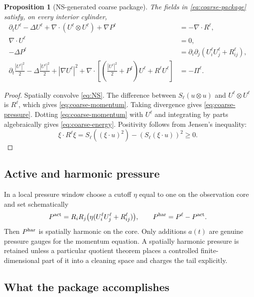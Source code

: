 \documentclass[11pt]{article}
\numberwithin{equation}{section}
\newtheorem{proposition}[theorem]{Proposition}
\theoremstyle{remark}
\begin{document}
\begin{proposition}[NS-generated coarse package]\label{prop:coarse-package}
The fields in \eqref{eq:coarse-package} satisfy, on every interior cylinder,
\begin{align}
\partial_tU^\ell-\Delta U^\ell
+\nabla\cdot(U^\ell\otimes U^\ell)+\nabla P^\ell
&=-\nabla\cdot R^\ell,\label{eq:coarse-momentum}\\
\nabla\cdot U^\ell&=0,\label{eq:coarse-div}\\
-\Delta P^\ell&=\partial_i\partial_j
(U_i^\ell U_j^\ell+R_{ij}^\ell),\label{eq:coarse-pressure}\\
\partial_t\frac{|U^\ell|^2}{2}
-\Delta\frac{|U^\ell|^2}{2}
+|\nabla U^\ell|^2
+\nabla\cdot\left[
\left(\frac{|U^\ell|^2}{2}+P^\ell\right)U^\ell+R^\ell U^\ell
\right]
&=-\Pi^\ell.\label{eq:coarse-energy}
\end{align}
\end{proposition}

\begin{proof}
Spatially convolve \eqref{eq:NS}. The difference between $S_\ell(u\otimes u)$ and $U^\ell\otimes U^\ell$ is $R^\ell$, which gives \eqref{eq:coarse-momentum}. Taking divergence gives \eqref{eq:coarse-pressure}. Dotting \eqref{eq:coarse-momentum} with $U^\ell$ and integrating by parts algebraically gives \eqref{eq:coarse-energy}. Positivity follows from Jensen's inequality:
\[
\xi\cdot R^\ell\xi
=S_\ell((\xi\cdot u)^2)-(S_\ell(\xi\cdot u))^2\ge0.
\]
\end{proof}

\subsection{Active and harmonic pressure}

In a local pressure window choose a cutoff $\eta$ equal to one on the observation core and set schematically
\begin{equation}\label{eq:active-pressure}
P^{\rm act}=R_iR_j\bigl(\eta(U_i^\ell U_j^\ell+R_{ij}^\ell)\bigr),
\qquad
P^{\rm har}=P^\ell-P^{\rm act}.
\end{equation}
Then $P^{\rm har}$ is spatially harmonic on the core. Only additions $a(t)$ are genuine pressure gauges for the momentum equation. A spatially harmonic pressure is retained unless a particular quotient theorem places a controlled finite-dimensional part of it into a cleaning space and charges the tail explicitly.

\subsection{What the package accomplishes}
\end{document}
